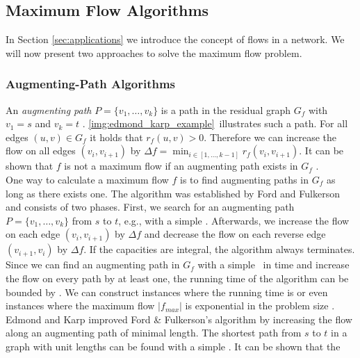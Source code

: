 
\subsection{Maximum Flow Algorithms}
\label{sec:max_flow}

In Section \ref{sec:applications} we introduce the concept of flows in a network. We
will now present two approaches to solve the maximum flow problem.

\subsubsection{Augmenting-Path Algorithms}
\label{sec:aug_path}

An \emph{augmenting path} $P = \{v_1,\ldots,v_k\}$ is a path in the residual graph $G_f$ with $v_1 = s$ and 
$v_k = t$ \cite{edmonds1972theoretical}. \autoref{img:edmond_karp_example}~illustrates such a path.
For all edges $(u,v) \in G_f$ it holds that $r_f(u,v) > 0$.
Therefore we can increase the flow on all edges $(v_i,v_{i+1})$ by 
$\Delta f = \min_{i \in [1,\ldots,k-1]} r_f(v_i,v_{i+1})$. It can be shown that $f$ is not a
maximum flow if an augmenting path exists in $G_f$ \cite{edmonds1972theoretical}. \\
One way to calculate a maximum flow $f$ is to find augmenting paths in $G_f$ as
long as there exists one. The algorithm was established by Ford and Fulkerson \cite{ford1956maximal} and
consists of two phases. First, we search for an augmenting path $P = \{v_1,\ldots,v_k\}$
from $s$ to $t$, e.g., with a simple \DFS. Afterwards, we increase the flow on each
edge $(v_i,v_{i+1})$ by $\Delta f$ and decrease the flow on each reverse edge $(v_{i+1},v_i)$
by $\Delta f$. If the capacities are integral, the algorithm always terminates. Since we can find an augmenting
path in $G_f$ with a simple \DFS~in  time and increase the
flow on every path by at least one, the running time of the algorithm can be bounded by .
We can construct instances where the running time is  or even instances where 
the maximum flow $|f_{max}|$ is exponential in the problem size \cite{edmonds1972theoretical}. \\
Edmond and Karp \cite{edmonds1972theoretical} improved Ford \& Fulkerson's algorithm by increasing the flow
along an augmenting path of minimal length. The shortest path from $s$ to $t$ in a 
graph with unit lengths can be found with a simple \BFS. It can be shown that the
